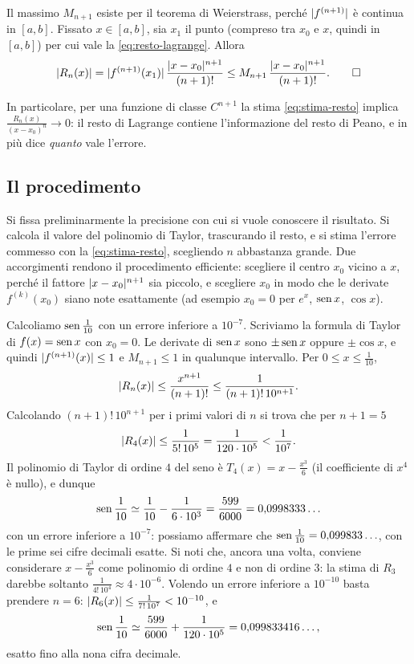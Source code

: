 \begin{dimostrazione}
Il massimo $M_{n+1}$ esiste per il teorema di Weierstrass, perché $\lvert f^{(n+1)}\rvert$ è continua
in $[a,b]$. Fissato $x\in[a,b]$, sia $x_{1}$ il punto (compreso tra $x_{0}$ e $x$, quindi in
$[a,b]$) per cui vale la \eqref{eq:resto-lagrange}. Allora
\[
  \lvert R_{n}(x)\rvert=\lvert f^{(n+1)}(x_{1})\rvert\,\frac{\lvert x-x_{0}\rvert^{n+1}}{(n+1)!}
  \le M_{n+1}\,\frac{\lvert x-x_{0}\rvert^{n+1}}{(n+1)!} . \qedhere
\]
\end{dimostrazione}

In particolare, per una funzione di classe $C^{n+1}$ la stima \eqref{eq:stima-resto} implica
$\frac{R_{n}(x)}{(x-x_{0})^{n}}\to0$: il resto di Lagrange contiene l'informazione del resto di Peano,
e in più dice \emph{quanto} vale l'errore.

\subsection{Il procedimento}

Si fissa preliminarmente la precisione con cui si vuole conoscere il risultato. Si
calcola il valore del polinomio di Taylor, trascurando il resto, e si stima l'errore
commesso con la \eqref{eq:stima-resto}, scegliendo $n$ abbastanza grande. Due accorgimenti
rendono il procedimento efficiente: scegliere il centro $x_{0}$ vicino a $x$, perché il
fattore $\lvert x-x_{0}\rvert^{n+1}$ sia piccolo, e scegliere $x_{0}$ in modo che le derivate $f^{(k)}(x_{0})$
siano note esattamente (ad esempio $x_{0}=0$ per $e^{x}$, $\operatorname{sen} x$, $\cos x$).

\begin{esempio}\label{es:sen-un-decimo}
Calcoliamo $\operatorname{sen}\frac1{10}$ con un errore inferiore a $10^{-7}$. Scriviamo la formula di Taylor di
$f(x)=\operatorname{sen} x$ con $x_{0}=0$. Le derivate di $\operatorname{sen} x$ sono $\pm\operatorname{sen} x$ oppure $\pm\cos x$, e quindi
$\lvert f^{(n+1)}(x)\rvert\le1$ e $M_{n+1}\le1$ in qualunque intervallo. Per $0\le x\le\frac1{10}$,
\[
  \lvert R_{n}(x)\rvert\le\frac{x^{n+1}}{(n+1)!}\le\frac1{(n+1)!\,10^{n+1}} .
\]
Calcolando $(n+1)!\,10^{n+1}$ per i primi valori di $n$ si trova che per $n+1=5$
\[
  \lvert R_{4}(x)\rvert\le\frac1{5!\,10^{5}}=\frac1{120\cdot10^{5}}<\frac1{10^{7}} .
\]
Il polinomio di Taylor di ordine $4$ del seno è $T_{4}(x)=x-\frac{x^{3}}6$ (il coefficiente di
$x^{4}$ è nullo), e dunque
\[
  \operatorname{sen}\frac1{10}\simeq\frac1{10}-\frac1{6\cdot10^{3}}=\frac{599}{6000}=0{,}0998333\ldots
\]
con un errore inferiore a $10^{-7}$: possiamo affermare che $\operatorname{sen}\frac1{10}=0{,}099833\ldots$, con
le prime sei cifre decimali esatte. Si noti che, ancora una volta, conviene considerare
$x-\frac{x^{3}}6$ come polinomio di ordine $4$ e non di ordine $3$: la stima di $R_{3}$ darebbe soltanto
$\frac1{4!\,10^{4}}\approx4\cdot10^{-6}$. Volendo un errore inferiore a $10^{-10}$ basta prendere $n=6$:
$\lvert R_{6}(x)\rvert\le\frac1{7!\,10^{7}}<10^{-10}$, e
\[
  \operatorname{sen}\frac1{10}\simeq\frac{599}{6000}+\frac1{120\cdot10^{5}}=0{,}099833416\ldots ,
\]
esatto fino alla nona cifra decimale.
\end{esempio}

